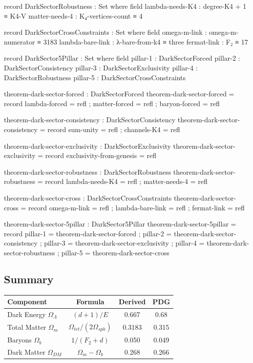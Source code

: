 \documentclass[11pt,a4paper]{book}
\def\text#1{#1}%
\begin{document}
\begin{code}
  record DarkSectorRobustness : Set where
    field
      lambda-needs-K4 : degree-K4 + 1 ≡ K4-V
      matter-needs-4  : K₄-vertices-count ≡ 4
  
  record DarkSectorCrossConstraints : Set where
    field
      omega-m-link     : omega-m-numerator ≡ 3183
      lambda-bare-link : λ-bare-from-k4 ≡ three
      fermat-link      : F₂ ≡ 17
  
  record DarkSector5Pillar : Set where
    field
      pillar-1 : DarkSectorForced
      pillar-2 : DarkSectorConsistency
      pillar-3 : DarkSectorExclusivity
      pillar-4 : DarkSectorRobustness
      pillar-5 : DarkSectorCrossConstraints
  
  theorem-dark-sector-forced : DarkSectorForced
  theorem-dark-sector-forced = record
    { lambda-forced = refl
    ; matter-forced = refl
    ; baryon-forced = refl
    }
  
  theorem-dark-sector-consistency : DarkSectorConsistency
  theorem-dark-sector-consistency = record
    { sum-unity   = refl
    ; channels-K4 = refl
    }
  
  theorem-dark-sector-exclusivity : DarkSectorExclusivity
  theorem-dark-sector-exclusivity = record
    { exclusivity-from-genesis = refl
    }
  
  theorem-dark-sector-robustness : DarkSectorRobustness
  theorem-dark-sector-robustness = record
    { lambda-needs-K4 = refl
    ; matter-needs-4  = refl
    }
  
  theorem-dark-sector-cross : DarkSectorCrossConstraints
  theorem-dark-sector-cross = record
    { omega-m-link     = refl
    ; lambda-bare-link = refl
    ; fermat-link      = refl
    }
  
  theorem-dark-sector-5pillar : DarkSector5Pillar
  theorem-dark-sector-5pillar = record
    { pillar-1 = theorem-dark-sector-forced
    ; pillar-2 = theorem-dark-sector-consistency
    ; pillar-3 = theorem-dark-sector-exclusivity
    ; pillar-4 = theorem-dark-sector-robustness
    ; pillar-5 = theorem-dark-sector-cross
    }
\end{code}

\subsection{Summary}

\begin{center}
\begin{tabular}{lccc}
\toprule
\textbf{Component} & \textbf{Formula} & \textbf{Derived} & \textbf{PDG} \\
\midrule
Dark Energy $\Omega_\Lambda$ & $(d+1)/E$ & 0.667 & 0.68 \\
Total Matter $\Omega_m$ & $\Omega_{\text{tet}}/(2\Omega_{\text{sph}})$ & 0.3183 & 0.315 \\
Baryons $\Omega_b$ & $1/(F_2 + d)$ & 0.050 & 0.049 \\
Dark Matter $\Omega_{\text{DM}}$ & $\Omega_m - \Omega_b$ & 0.268 & 0.266 \\
\bottomrule
\end{tabular}
\end{center}
\end{document}
